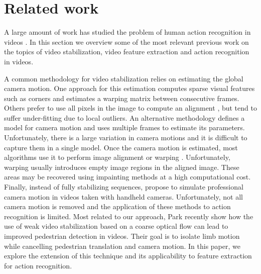 \section{Related work}
\label{related_work}

A large amount of work has studied the problem of human action recognition in videos \cite{Aggarwal2011}. In
this section we overview some of the most relevant previous work on the topics of video stabilization, video
feature extraction and action recognition in videos.

A common methodology for video stabilization relies on estimating the global camera motion. One approach for
this estimation computes sparse visual features \cite{Brown2003,Capel1998, Zoghlami1997} such as corners
\cite{Censi1999} and estimates a warping matrix between consecutive frames. Others prefer to use all pixels
in the image to compute an alignment \cite{Lucas1981, Matsushita2006}, but tend to suffer under-fitting due
to local outliers. An alternative methodology defines a model for camera motion
\cite{Buehler2001,Hansen1994} and uses multiple frames to estimate its parameters. Unfortunately, there is a
large variation in camera motions and it is difficult to capture them in a single model. Once the camera
motion is estimated, most algorithms use it to perform image alignment or warping \cite{szeliski2006image}.
Unfortunately, warping usually introduces empty image regions in the aligned image. These areas may be
recovered using impainting methods \cite{Wexler2004} at a high computational cost. Finally, instead of fully
stabilizing sequences, \cite{Gleicher2008,GrundmannKwatra2011} propose to simulate professional camera
motion in videos taken with handheld cameras. Unfortunately, not all camera motion is removed and the
application of these methods to action recognition is limited. Most related to our approach, Park \etal
\cite{Park2013} recently show how the use of weak video stabilization based on a coarse optical flow can
lead to improved pedestrian detection in videos. Their goal is to isolate limb motion while cancelling
pedestrian translation and camera motion. In this paper, we explore the extension of this technique and its
applicability to feature extraction for action recognition.


